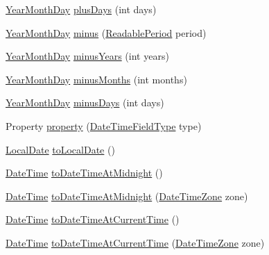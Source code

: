 \begin{DoxyCompactItemize}
\item 
\hyperlink{classorg_1_1joda_1_1time_1_1_year_month_day}{Year\-Month\-Day} \hyperlink{classorg_1_1joda_1_1time_1_1_year_month_day_a8726731bd7f13e5089ae82fdf76d0ef4}{plus\-Days} (int days)
\item 
\hyperlink{classorg_1_1joda_1_1time_1_1_year_month_day}{Year\-Month\-Day} \hyperlink{classorg_1_1joda_1_1time_1_1_year_month_day_aa48c77f268b231e80de916c36efb95ae}{minus} (\hyperlink{interfaceorg_1_1joda_1_1time_1_1_readable_period}{Readable\-Period} period)
\item 
\hyperlink{classorg_1_1joda_1_1time_1_1_year_month_day}{Year\-Month\-Day} \hyperlink{classorg_1_1joda_1_1time_1_1_year_month_day_ab1f4513a3c0c756d1cf68f22db20c7e7}{minus\-Years} (int years)
\item 
\hyperlink{classorg_1_1joda_1_1time_1_1_year_month_day}{Year\-Month\-Day} \hyperlink{classorg_1_1joda_1_1time_1_1_year_month_day_ad77be324995a5e4f58e245e33147e8c1}{minus\-Months} (int months)
\item 
\hyperlink{classorg_1_1joda_1_1time_1_1_year_month_day}{Year\-Month\-Day} \hyperlink{classorg_1_1joda_1_1time_1_1_year_month_day_ae33681c7f23afee7454d56268aeed33d}{minus\-Days} (int days)
\item 
Property \hyperlink{classorg_1_1joda_1_1time_1_1_year_month_day_a33ef80b8bd1905364246947a92a44c75}{property} (\hyperlink{classorg_1_1joda_1_1time_1_1_date_time_field_type}{Date\-Time\-Field\-Type} type)
\item 
\hyperlink{classorg_1_1joda_1_1time_1_1_local_date}{Local\-Date} \hyperlink{classorg_1_1joda_1_1time_1_1_year_month_day_a60d60f36104572fa09675222db56c456}{to\-Local\-Date} ()
\item 
\hyperlink{classorg_1_1joda_1_1time_1_1_date_time}{Date\-Time} \hyperlink{classorg_1_1joda_1_1time_1_1_year_month_day_a734f42140a1cf520e8f5d8d82598270f}{to\-Date\-Time\-At\-Midnight} ()
\item 
\hyperlink{classorg_1_1joda_1_1time_1_1_date_time}{Date\-Time} \hyperlink{classorg_1_1joda_1_1time_1_1_year_month_day_a5b5afdcc37b2a95f55b14f712ce99318}{to\-Date\-Time\-At\-Midnight} (\hyperlink{classorg_1_1joda_1_1time_1_1_date_time_zone}{Date\-Time\-Zone} zone)
\item 
\hyperlink{classorg_1_1joda_1_1time_1_1_date_time}{Date\-Time} \hyperlink{classorg_1_1joda_1_1time_1_1_year_month_day_af22ec35cceaf879aee8906fc9a6091bd}{to\-Date\-Time\-At\-Current\-Time} ()
\item 
\hyperlink{classorg_1_1joda_1_1time_1_1_date_time}{Date\-Time} \hyperlink{classorg_1_1joda_1_1time_1_1_year_month_day_ab40272af4ee99e11cea60ba1e9c9e61d}{to\-Date\-Time\-At\-Current\-Time} (\hyperlink{classorg_1_1joda_1_1time_1_1_date_time_zone}{Date\-Time\-Zone} zone)

\end{DoxyCompactItemize}
